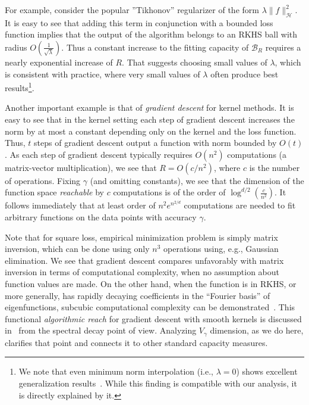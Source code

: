 \documentclass[final,12pt]{colt2018}
\renewcommand{\H}{\mathcal{H}}
\newcommand{\Br}{\mathcal{B}_R}
\begin{document}
For example, consider the popular ''Tikhonov'' regularizer of the form $\lambda\|f\|_\H^2$. It is easy to see that adding this term in conjunction with a bounded loss function implies that the output of the algorithm  belongs to an RKHS ball with radius $O\left(\frac{1}{\sqrt{\lambda}}\right)$. 
Thus a constant increase to the fitting capacity of $\Br$ requires a nearly exponential increase of $R$. That suggests choosing small values of $\lambda$, which  is consistent with practice, where very small values of $\lambda$ often produce best results\footnote{We note that  even minimum norm interpolation (i.e., $\lambda=0$) shows excellent generalization results~\cite{belkin2018understand}.  While this finding is compatible with our analysis, it is directly explained  by it.}.


Another important example is that of {\it gradient descent} for kernel methods. It is easy to see that in the kernel setting each step of gradient descent increases the norm by 
at most a constant depending only on the kernel and the loss function. Thus, $t$ steps of gradient descent output a function with norm bounded by  $O(t)$. 
As each step of gradient descent typically requires $O(n^2)$ computations (a matrix-vector multiplication), we see that $R=O(c/n^2)$, where $c$ is the number of operations. 
Fixing $\gamma$ (and omitting constants), we see that the dimension of the function space {\it reachable} by $c$ computations is of the order of $\log^{d/2}(\frac{c}{n^2})$. It follows immediately that at least order of $n^2 e^{n^{2/d}}$  computations are needed to fit arbitrary functions on the data points with accuracy $\gamma$. 


Note that for square loss, empirical minimization problem is simply matrix inversion, which can be done  using only $n^3$ operations using, e.g., Gaussian elimination.
We see that gradient descent compares unfavorably with matrix inversion in terms of computational complexity, when no assumption about function values are made.  On the other hand, when the function is in RKHS, or more generally, has rapidly decaying coefficients in the ``Fourier basis'' of eigenfunctions, subcubic computational complexity can be demonstrated~\cite{yao2007early, raskutti2014early}. This functional {\it algorithmic reach} for gradient descent with smooth kernels is discussed in~\cite{ma2017diving}  from the spectral decay point of view. Analyzing $V_\gamma$ dimension, as we do here, clarifies that point and connects it  to other standard capacity measures.
\end{document}
